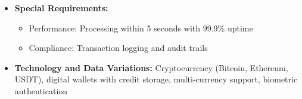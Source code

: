 \begin{itemize}
    \begin{itemize}
        \item 3a. Network congested or insufficient funds: System provides wait time or suggests alternatives
        \item 5a. Payment fails or fraud detected: System retries with backoff or holds for review
        \item 6a. Crediting fails: System queues retry and notifies recipient
    \end{itemize}
    \item \textbf{Special Requirements:}
    \begin{itemize}
        \item Performance: Processing within 5 seconds with 99.9\% uptime
        \item Compliance: Transaction logging and audit trails
    \end{itemize}
    \item \textbf{Technology and Data Variations:} Cryptocurrency (Bitcoin, Ethereum, USDT), digital wallets with credit storage, multi-currency support, biometric authentication
\end{itemize}

